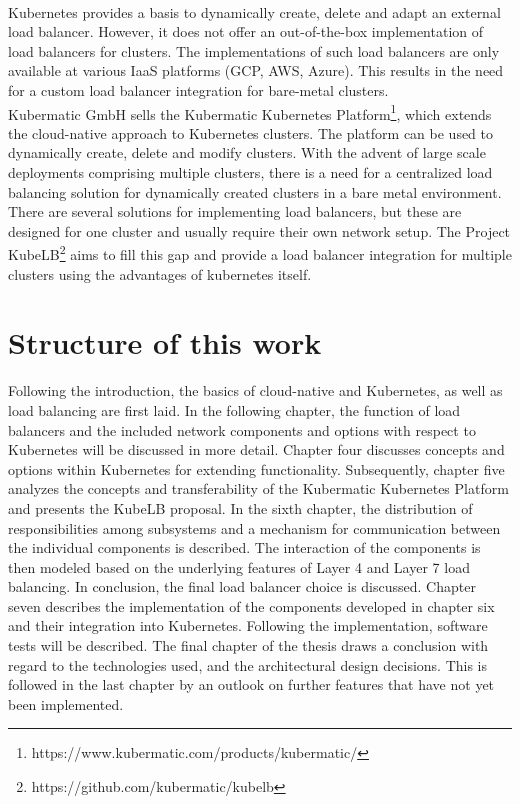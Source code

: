 \\
Kubernetes provides a basis to dynamically create, delete and adapt an external load balancer.
However, it does not offer an out-of-the-box implementation of load balancers for clusters.
The implementations of such load balancers are only available at various IaaS platforms (GCP, AWS, Azure).
This results in the need for a custom load balancer integration for bare-metal clusters.
\\
Kubermatic GmbH sells the Kubermatic Kubernetes Platform\footnote{https://www.kubermatic.com/products/kubermatic/}, which extends the cloud-native approach to Kubernetes clusters.
The platform can be used to dynamically create, delete and modify clusters.
With the advent of large scale deployments comprising multiple clusters, there is a need for a centralized load balancing solution for dynamically created clusters in a bare metal environment.
There are several solutions for implementing load balancers, but these are designed for one cluster and usually require their own network setup.
The Project KubeLB\footnote{https://github.com/kubermatic/kubelb} aims to fill this gap and provide a load balancer integration for multiple clusters using the advantages of kubernetes itself.

\section{Structure of this work}
Following the introduction, the basics of cloud-native and Kubernetes, as well as load balancing are first laid.
In the following chapter, the function of load balancers and the included network components and options with respect to Kubernetes will be discussed in more detail.
Chapter four discusses concepts and options within Kubernetes for extending functionality.
Subsequently, chapter five analyzes the concepts and transferability of the Kubermatic Kubernetes Platform and presents the KubeLB proposal.
In the sixth chapter, the distribution of responsibilities among subsystems and a mechanism for communication between the individual components is described.
The interaction of the components is then modeled based on the underlying features of Layer 4 and Layer 7 load balancing.
In conclusion, the final load balancer choice is discussed.
Chapter seven describes the implementation of the components developed in chapter six and their integration into Kubernetes.
Following the implementation, software tests will be described.
The final chapter of the thesis draws a conclusion with regard to the technologies used, and the architectural design decisions.
This is followed in the last chapter by an outlook on further features that have not yet been implemented.
